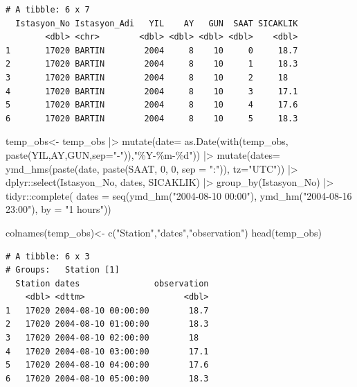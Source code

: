 \documentclass[
  letterpaper,
  DIV=11,
  numbers=noendperiod,
  abstract]{scrartcl}
\newenvironment{Shaded}{\begin{snugshade}}{\end{snugshade}}
\newcommand{\AttributeTok}[1]{\textcolor[rgb]{0.40,0.45,0.13}{#1}}
\newcommand{\DecValTok}[1]{\textcolor[rgb]{0.68,0.00,0.00}{#1}}
\newcommand{\FunctionTok}[1]{\textcolor[rgb]{0.28,0.35,0.67}{#1}}
\newcommand{\NormalTok}[1]{\textcolor[rgb]{0.00,0.23,0.31}{#1}}
\newcommand{\OtherTok}[1]{\textcolor[rgb]{0.00,0.23,0.31}{#1}}
\newcommand{\SpecialCharTok}[1]{\textcolor[rgb]{0.37,0.37,0.37}{#1}}
\newcommand{\StringTok}[1]{\textcolor[rgb]{0.13,0.47,0.30}{#1}}
\begin{document}
\begin{verbatim}
# A tibble: 6 x 7
  Istasyon_No Istasyon_Adi   YIL    AY   GUN  SAAT SICAKLIK
        <dbl> <chr>        <dbl> <dbl> <dbl> <dbl>    <dbl>
1       17020 BARTIN        2004     8    10     0     18.7
2       17020 BARTIN        2004     8    10     1     18.3
3       17020 BARTIN        2004     8    10     2     18  
4       17020 BARTIN        2004     8    10     3     17.1
5       17020 BARTIN        2004     8    10     4     17.6
6       17020 BARTIN        2004     8    10     5     18.3
\end{verbatim}

\begin{Shaded}
\begin{Highlighting}[]
\NormalTok{temp\_obs}\OtherTok{\textless{}{-}}
\NormalTok{  temp\_obs }\SpecialCharTok{|\textgreater{}}
  \FunctionTok{mutate}\NormalTok{(}\AttributeTok{date=} \FunctionTok{as.Date}\NormalTok{(}\FunctionTok{with}\NormalTok{(temp\_obs, }\FunctionTok{paste}\NormalTok{(YIL,AY,GUN,}\AttributeTok{sep=}\StringTok{"{-}"}\NormalTok{)),}\StringTok{"\%Y{-}\%m{-}\%d"}\NormalTok{)) }\SpecialCharTok{|\textgreater{}}
  \FunctionTok{mutate}\NormalTok{(}\AttributeTok{dates=} \FunctionTok{ymd\_hms}\NormalTok{(}\FunctionTok{paste}\NormalTok{(date, }\FunctionTok{paste}\NormalTok{(SAAT, }\DecValTok{0}\NormalTok{, }\DecValTok{0}\NormalTok{, }\AttributeTok{sep =} \StringTok{":"}\NormalTok{)), }\AttributeTok{tz=}\StringTok{"UTC"}\NormalTok{)) }\SpecialCharTok{|\textgreater{}}
\NormalTok{  dplyr}\SpecialCharTok{::}\FunctionTok{select}\NormalTok{(Istasyon\_No, dates, SICAKLIK) }\SpecialCharTok{|\textgreater{}} 
  \FunctionTok{group\_by}\NormalTok{(Istasyon\_No) }\SpecialCharTok{|\textgreater{}} 
\NormalTok{  tidyr}\SpecialCharTok{::}\FunctionTok{complete}\NormalTok{( }\AttributeTok{dates =} \FunctionTok{seq}\NormalTok{(}\FunctionTok{ymd\_hm}\NormalTok{(}\StringTok{"2004{-}08{-}10 00:00"}\NormalTok{), }
                               \FunctionTok{ymd\_hm}\NormalTok{(}\StringTok{"2004{-}08{-}16 23:00"}\NormalTok{), }\AttributeTok{by =} \StringTok{"1 hours"}\NormalTok{))}

\FunctionTok{colnames}\NormalTok{(temp\_obs)}\OtherTok{\textless{}{-}} \FunctionTok{c}\NormalTok{(}\StringTok{"Station"}\NormalTok{,}\StringTok{"dates"}\NormalTok{,}\StringTok{"observation"}\NormalTok{)}
\FunctionTok{head}\NormalTok{(temp\_obs)}
\end{Highlighting}
\end{Shaded}

\begin{verbatim}
# A tibble: 6 x 3
# Groups:   Station [1]
  Station dates               observation
    <dbl> <dttm>                    <dbl>
1   17020 2004-08-10 00:00:00        18.7
2   17020 2004-08-10 01:00:00        18.3
3   17020 2004-08-10 02:00:00        18  
4   17020 2004-08-10 03:00:00        17.1
5   17020 2004-08-10 04:00:00        17.6
6   17020 2004-08-10 05:00:00        18.3
\end{verbatim}
\end{document}
